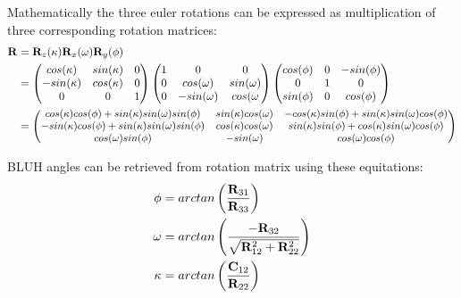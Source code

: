 \documentclass[a4paper,12pt]{article}
\newcommand{\ematr}[1]{
{\bf #1}
}
\newcommand{\escal}[1]{
{\it #1}
}
\begin{document}
Mathematically the three euler rotations can be expressed as multiplication of three corresponding
rotation matrices:
 \begin{equation}
 \begin{split}
\ematr{R} &= \ematr{R}_{z}(\escal{\kappa}) \ematr{R}_{x}(\escal{\omega}) \ematr{R}_{y}(\escal{\phi}) \\
	  &= \begin{pmatrix}
	      cos(\escal{\kappa}) & sin(\escal{\kappa}) & 0 \\
	      -sin(\escal{\kappa}) & cos(\escal{\kappa}) & 0 \\
	      0 & 0 & 1
	      \end{pmatrix}
	      \begin{pmatrix}
	      1 & 0 & 0 \\
	      0 & cos(\escal{\omega}) & sin(\escal{\omega}) \\
	      0 & -sin(\escal{\omega}) & cos(\escal{\omega} 
	      \end{pmatrix}
	      \begin{pmatrix}
	      cos(\escal{\phi}) & 0 & -sin(\escal{\phi}) \\
	      0 & 1 & 0 \\
	      sin(\phi) & 0 & cos(\phi)      
	      \end{pmatrix} \\
	  &=  
	      \small
	      \begin{pmatrix}
	      cos(\escal{\kappa}) cos(\escal{\phi}) + sin(\escal{\kappa}) sin(\escal{\omega}) sin(\escal{\phi}) & 
	      sin(\escal{\kappa}) cos(\escal{\omega})  & 
	      -cos(\escal{\kappa}) sin(\escal{\phi}) + sin(\escal{\kappa}) sin(\escal{\omega}) cos(\escal{\phi}) 
	      \\
	      -sin(\escal{\kappa}) cos(\escal{\phi}) + sin(\escal{\kappa}) sin(\escal{\omega}) sin(\escal{\phi}) & 
	      cos(\escal{\kappa}) cos(\escal{\omega})  & 
	      sin(\escal{\kappa}) sin(\escal{\phi}) + cos(\escal{\kappa}) sin(\escal{\omega}) cos(\escal{\phi}) 
	      \\	      
	      cos(\escal{\omega}) sin(\escal{\phi}) & 
	      -sin(\escal{\omega})  & 
	      cos(\escal{\omega}) cos(\escal{\phi}) 
	      \\		      
	      \end{pmatrix} 
\end{split}
\end{equation}

BLUH angles can be retrieved from rotation matrix using these equitations: 
 \begin{equation}
 \begin{split}
\escal{\phi} &=  arctan \left(\frac{\ematr{R}_{31}}{\ematr{R}_{33}} \right)\\
\escal{\omega} &= arctan \left(\frac{-\ematr{R}_{32}}{ \sqrt{ \ematr{R}_{12}^{2} + \ematr{R}_{22}^{2} }} \right)\\
\escal{\kappa} &=  arctan \left(\frac{\ematr{C}_{12}}{\ematr{R}_{22}} \right)
\end{split}
\end{equation}
\end{document}
